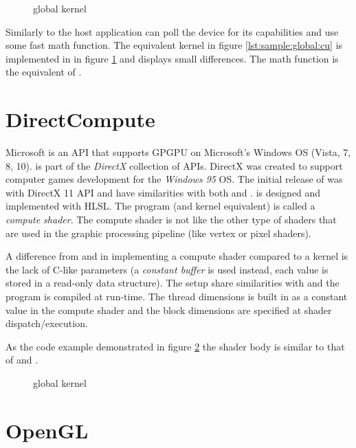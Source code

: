 \begin{figure}
	\centering
	\fbox{}
	\caption{{\OCL} global kernel}
	\label{lst:sample:global:ocl}	
\end{figure}

Similarly to {\CU} the host application can poll the device for its capabilities and use some fast math function. The equivalent {\CU} kernel in figure \ref{lst:sample:global:cu} is implemented in {\OCL} in figure \ref{lst:sample:global:ocl} and displays small differences. The {\OCL} math function  is the equivalent of .

\section{DirectCompute}

Microsoft {\DX} is an \gls{API} that supports \gls{GPGPU} on Microsoft's Windows \gls{OS} (Vista, 7, 8, 10). {\DX} is part of the \emph{DirectX} collection of APIs. DirectX was created to support computer games development for the \emph{Windows 95} OS. The initial release of {\DX} was with DirectX 11 \gls{API} and have similarities with both {\CU} and {\OCL}. {\DX} is designed and implemented with \gls{HLSL}. The program (and kernel equivalent) is called a \emph{compute shader}. The compute shader is not like the other type of shaders that are used in the graphic processing pipeline (like vertex or pixel shaders).

A difference from {\CU} and {\OCL} in implementing a compute shader compared to a kernel is the lack of C-like parameters (a \emph{constant buffer} is used instead, each value is stored in a read-only data structure). The setup share similarities with {\OCL} and the program is compiled at run-time. The thread dimensions is built in as a constant value in the compute shader and the block dimensions are specified at shader dispatch/execution.

As the code example demonstrated in figure \ref{lst:sample:global:dx} the shader body is similar to that of {\CU} and {\OCL}.

\begin{figure}
	\centering
	\fbox{}
	\caption{{\DX} global kernel}
	\label{lst:sample:global:dx}	
\end{figure}

\section{OpenGL}

